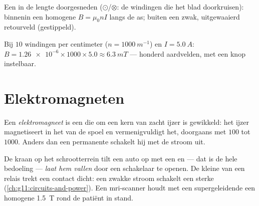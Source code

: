 \begin{omfigure}

{\small Een  in de lengte doorgesneden ($\odot$/$\otimes$: de
windingen die het blad doorkruisen): binnenin een homogene
$B = \mu_0 n I$ langs de as; buiten een zwak, uitgewaaierd retourveld
(gestippeld).}
\end{omfigure}

\begin{example}\label{ex:g11:magnetic-fields:solenoid}
Bij $10$ windingen per centimeter ($n = \qty{1000}{m^{-1}}$) en
$I = \qty{5.0}{A}$: $B = \num{1.26e-6} \times 1000 \times 5.0 \approx
\qty{6.3}{mT}$ --- honderd aardvelden, met een knop instelbaar.
\end{example}

\section{Elektromagneten}

\begin{definition}[Elektromagneet]\label{def:g11:magnetic-fields:electromagnet}
Een \emph{elektromagneet} is een  die om
een kern van zacht ijzer is gewikkeld: het ijzer magnetiseert in het 
van de spoel en vermenigvuldigt het, doorgaans met $100$ tot $1000$.
Anders dan een permanente  schakelt hij met de stroom uit.
\end{definition}

\begin{remark}\label{rem:g11:magnetic-fields:machines}
De kraan op het schrootterrein tilt een auto op met een  en
--- dat is de hele bedoeling --- \emph{laat hem vallen} door een
schakelaar te openen. De kleine  van een relais trekt een
contact dicht: een zwakke stroom schakelt een sterke
(\cref{ch:g11:circuits-and-power}). Een mri-scanner houdt met een
supergeleidende  een homogene \qty{1.5}{T} rond de patiënt in
stand.
\end{remark}

